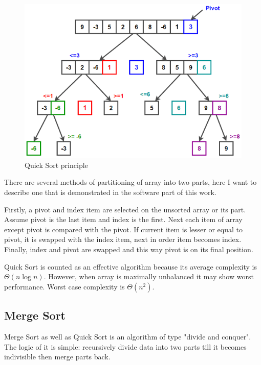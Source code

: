 \documentclass[
  field=inf,
  biblatex,
  language=english,
  glossaries,
  theorems=false,
  index
]{kidiplom}
\begin{document}
\begin{figure}[H]
\begin{center}
	
	\includegraphics[scale=0.7]{img/Quicksort.png}
	\caption{Quick Sort principle}\label{fig:insert}
\end{center}
\end{figure}

There are several methods of partitioning of array into two parts, here I want to describe one that is demonstrated in the software part of this work.

Firstly, a pivot and index item are selected on the unsorted array or its part. Assume pivot is the last item and index is the first. Next each item of array except pivot is compared with the pivot. If current item is lesser or equal to pivot, it is swapped with the index item, next in order item becomes index. Finally, index and pivot are swapped and this way pivot is on its final position.

Quick Sort is counted as an effective algorithm because its average complexity is $\Theta(n \log n)$. However, when array is maximally unbalanced it may show worst performance. Worst case complexity is $\Theta(n^2)$.

\subsection{Merge Sort}

Merge Sort as well as Quick Sort is an algorithm of type "divide and conquer". The logic of it is simple: recursively divide data into two parts till it becomes indivisible then merge parts back.
\end{document}

